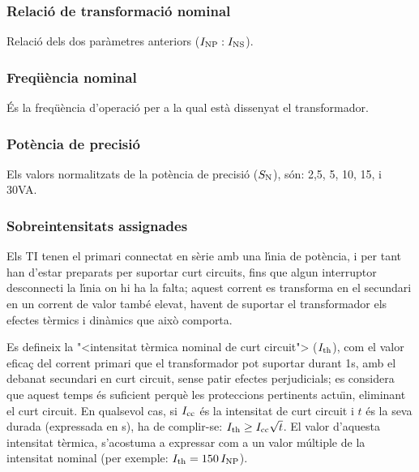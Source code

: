 \subsubsection{Relaci\'{o} de transformaci\'{o} nominal}

Relaci\'{o} dels dos  par\`{a}metres anteriors ($I_\mathrm{NP}:I_\mathrm{NS}$).

\subsubsection{Freq\"{u}\`{e}ncia nominal}

 \'{E}s la freq\"{u}\`{e}ncia d'operaci\'{o} per a la qual    est\`{a} dissenyat el transformador.

\subsubsection{Pot\`{e}ncia de precisi\'{o}}

 Els valors normalitzats de la pot\`{e}ncia de precisi\'{o}
 ($S_\mathrm{N}$), s\'{o}n: 2,5, 5, 10, 15, i 30\unit{VA}.

\subsubsection{Sobreintensitats  assignades}

 Els TI
tenen el primari connectat en s\`{e}rie amb una l\'{\i}nia de pot\`{e}ncia, i per tant han
d'estar preparats per suportar curt circuits, fins que algun
interruptor desconnecti la l\'{\i}nia on hi ha la falta; aquest
corrent es transforma en el secundari en un corrent de valor
tamb\'{e} elevat, havent de suportar el transformador els efectes t\`{e}rmics
i din\`{a}mics que aix\`{o} comporta.

Es defineix la {"<}intensitat t\`{e}rmica nominal de curt circuit{">}
($I_\mathrm{th}$), com el valor efica\c{c} del  corrent primari que el
transformador pot suportar durant 1\unit{s}, amb el debanat
secundari en curt circuit, sense patir efectes perjudicials; es
considera que aquest temps \'{e}s suficient perqu\`{e} les proteccions
pertinents actu\"{\i}n, eliminant el curt circuit. En qualsevol cas, si
$I_\mathrm{cc}$ \'{e}s la intensitat de curt circuit i $t$ \'{e}s la seva durada
(expressada en s), ha de complir-se: $I_\mathrm{th}\geq
I_\mathrm{cc}\sqrt{t}$. El valor d'aquesta intensitat t\`{e}rmica,
s'acostuma a expressar com a un valor m\'{u}ltiple de la intensitat
nominal (per exemple: $I_\mathrm{th}=150\,I_\mathrm{NP}$).

